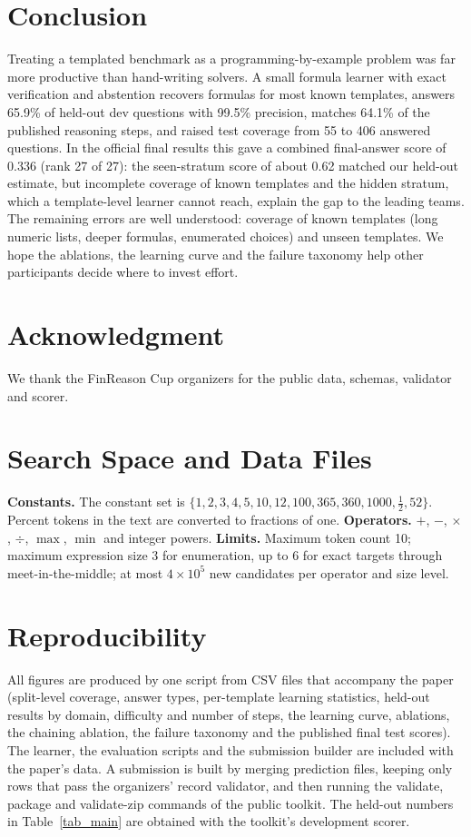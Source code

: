 \documentclass[conference]{IEEEtran}
\begin{document}
\section{Conclusion}
Treating a templated benchmark as a programming-by-example problem was far more
productive than hand-writing solvers. A small formula learner with exact
verification and abstention recovers formulas for most known templates, answers
65.9\% of held-out dev questions with 99.5\% precision, matches 64.1\% of the
published reasoning steps, and raised test coverage from 55 to 406 answered
questions. In the official final results this gave a combined final-answer score
of 0.336 (rank 27 of 27): the seen-stratum score of about 0.62 matched our
held-out estimate, but incomplete coverage of known templates and the hidden
stratum, which a template-level learner cannot reach, explain the gap to the
leading teams. The remaining errors are well understood: coverage of known
templates (long numeric lists, deeper formulas, enumerated choices) and unseen
templates. We hope the ablations, the learning curve and the failure taxonomy
help other participants decide where to invest effort.

\section*{Acknowledgment}
We thank the FinReason Cup organizers for the public data, schemas, validator and
scorer.




\appendices
\section{Search Space and Data Files}
\textbf{Constants.} The constant set is $\{1,2,3,4,5,10,12,100,365,360,1000,
\tfrac12,52\}$. Percent tokens in the text are converted to fractions of one.
\textbf{Operators.} $+$, $-$, $\times$, $\div$, $\max$, $\min$ and integer powers.
\textbf{Limits.} Maximum token count 10; maximum expression size 3 for
enumeration, up to 6 for exact targets through meet-in-the-middle; at most
$4\times10^{5}$ new candidates per operator and size level.

\section{Reproducibility}
All figures are produced by one script from CSV files that accompany the paper
(split-level coverage, answer types, per-template learning statistics,
held-out results by domain, difficulty and number of steps, the learning curve,
ablations, the chaining ablation, the failure taxonomy and the published final
test scores). The learner, the
evaluation scripts and the submission builder are included with the paper's
data. A submission is built by merging prediction files, keeping only rows that
pass the organizers' record validator, and then running the validate, package
and validate-zip commands of the public toolkit. The held-out numbers in
Table~\ref{tab_main} are obtained with the toolkit's development scorer.
\end{document}
